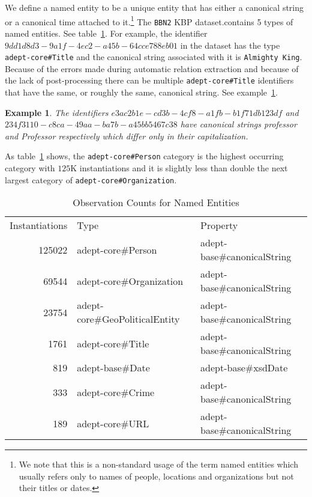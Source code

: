 \documentclass[paper=a4,fontsize=11pt]{scrartcl}
\newcommand{\tabref}[1]{table~\ref{#1}}
\newcommand{\exref}[1]{example~\ref{#1}}
\newtheorem{example}{Example}
\numberwithin{equation}{section}    %
\numberwithin{figure}{section}      %
\numberwithin{table}{section}       %
\newcommand{\dataset}[0]{\texttt{BBN2} KBP dataset.}
\begin{document}
We define a named entity to be a unique entity that has either a canonical string
or a canonical time attached to it.\footnote{
We note that this is a non-standard usage of the term named entities which usually refers only to
names of people, locations and organizations but not their titles or dates.}
The \dataset contains 5 types of named entities. See \tabref{tab:type}.
For example, the identifier $9dd1d8d3-9a1f-4ec2-a45b-64cce788eb01$ in the dataset has
the type \texttt{adept-core\#Title}
and the canonical string associated with it is \texttt{Almighty King}.
 Because of the errors made
during automatic relation extraction and because of the lack of post-processing there can be multiple
\texttt{adept-core\#Title} identifiers that have the same, or roughly the same, canonical string.
See \exref{ex:title-cap}.
\begin{example}
\label{ex:title-cap}
The identifiers $e3ac2b1e-cd3b-4cf8-a1fb-b1f71db123df$ and
$234f3110-c8ca-49aa-ba7b-a45bb5467c38$ have canonical strings \textit{professor} and
\textit{Professor} respectively which differ only in their capitalization.
\end{example}

As \tabref{tab:type} shows, the \texttt{adept-core\#Person} category is the highest occurring
category with $125$K instantiations
and it is slightly less than double the next largest category of \texttt{adept-core\#Organization}.

\begin{table}[htbp]
  \centering
  \begin{tabular}{r l l}
    Instantiations & Type                          & Property                   \\
    125022         & adept-core\#Person             & adept-base\#canonicalString \\
    69544          & adept-core\#Organization       & adept-base\#canonicalString \\
    23754          & adept-core\#GeoPoliticalEntity & adept-base\#canonicalString \\
    1761           & adept-core\#Title              & adept-base\#canonicalString \\
    819            & adept-base\#Date               & adept-base\#xsdDate         \\
    333            & adept-core\#Crime              & adept-base\#canonicalString \\
    189            & adept-core\#URL                & adept-base\#canonicalString \\
  \end{tabular}
  \caption{Observation Counts for Named Entities}
  \label{tab:type}
\end{table}
\end{document}
